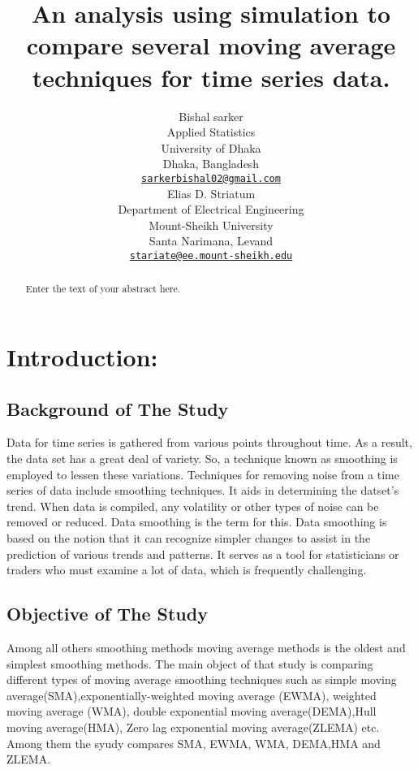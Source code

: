 \documentclass{article}
\title{An analysis using simulation to compare several moving average
techniques for time series data.}
\author{
    Bishal sarker
   \\
    Applied Statistics \\
    University of Dhaka \\
  Dhaka, Bangladesh \\
  \texttt{\href{mailto:sarkerbishal02@gmail.com}{\nolinkurl{sarkerbishal02@gmail.com}}} \\
   \And
    Elias D. Striatum
   \\
    Department of Electrical Engineering \\
    Mount-Sheikh University \\
  Santa Narimana, Levand \\
  \texttt{\href{mailto:stariate@ee.mount-sheikh.edu}{\nolinkurl{stariate@ee.mount-sheikh.edu}}} \\
  }
\begin{document}
\maketitle


\begin{abstract}
Enter the text of your abstract here.
\end{abstract}


\hypertarget{introduction}{%
\section{Introduction:}\label{introduction}}

\hypertarget{background-of-the-study}{%
\subsection{Background of The Study}\label{background-of-the-study}}

Data for time series is gathered from various points throughout time. As
a result, the data set has a great deal of variety. So, a technique
known as smoothing is employed to lessen these variations. Techniques
for removing noise from a time series of data include smoothing
techniques. It aids in determining the datset's trend. When data is
compiled, any volatility or other types of noise can be removed or
reduced. Data smoothing is the term for this. Data smoothing is based on
the notion that it can recognize simpler changes to assist in the
prediction of various trends and patterns. It serves as a tool for
statisticians or traders who must examine a lot of data, which is
frequently challenging.

\hypertarget{objective-of-the-study}{%
\subsection{Objective of The Study}\label{objective-of-the-study}}

Among all others smoothing methods moving average methods is the oldest
and simplest smoothing methods. The main object of that study is
comparing different types of moving average smoothing techniques such as
simple moving average(SMA),exponentially-weighted moving average (EWMA),
weighted moving average (WMA), double exponential moving
average(DEMA),Hull moving average(HMA), Zero lag exponential moving
average(ZLEMA) etc. Among them the syudy compares SMA, EWMA, WMA,
DEMA,HMA and ZLEMA.
\end{document}

